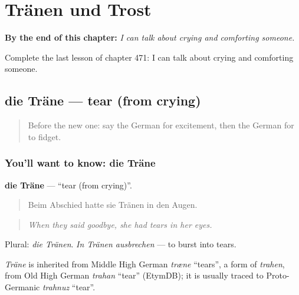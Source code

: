 
\chapter{Tränen und Trost}
\label{ch:ge-tranen-und-trost}

\begin{chapteropening}
\textbf{By the end of this chapter:} \emph{I can talk about crying and comforting someone.}

Complete the last lesson of chapter 471: I can talk about crying and comforting someone.
\end{chapteropening}

\section[die Träne]{die Träne — tear (from crying)}

\label{lesson:GE-C471-traene}



\begin{quote}
Before the new one: say the German for excitement, then the German for to fidget.
\end{quote}

\subsection*{You'll want to know: die Träne}
\textbf{die Träne} — \textquotedblleft{}tear (from crying)\textquotedblright{}.

\begin{quote}
Beim Abschied hatte sie Tränen in den Augen.
\end{quote}

\begin{quote}
\emph{When they said goodbye, she had tears in her eyes.}
\end{quote}

Plural: \emph{die Tränen}. \emph{In Tränen ausbrechen} — to burst into tears.

\begin{cousinweb}
\emph{Träne} is inherited from Middle High German \emph{træne} \textquotedblleft{}tears\textquotedblright{}, a form of \emph{trahen}, from Old High German \emph{trahan} \textquotedblleft{}tear\textquotedblright{} (EtymDB); it is usually traced to Proto-Germanic \emph{trahnuz} \textquotedblleft{}tear\textquotedblright{}.
\end{cousinweb}

